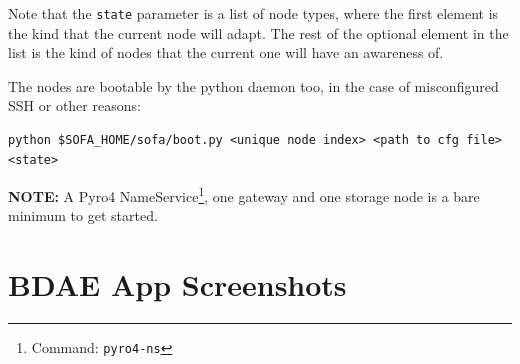 Note that the \texttt{state} parameter is a list of node types, where the first element is the kind that the current node will adapt. The rest of the optional element in the list is the kind of nodes that the current one will have an awareness of.
\newline

The nodes are bootable by the python daemon too, in the case of misconfigured SSH or other reasons:
\vspace*{2mm}

\begin{lstlisting}[numbers=none, backgroundcolor=\color{sourcebackground}, rulecolor=\color{sourcebackground}, framextopmargin=5pt, framexbottommargin=5pt, frame=tb, xrightmargin=15pt, commentstyle=\color{bashcommetcolor}, showstringspaces=false, deletendkeywords={file, list}]
	python $SOFA_HOME/sofa/boot.py <unique node index> <path to cfg file> <state>
\end{lstlisting}	

{\sffamily\textbf{NOTE:}} A Pyro4 NameService\footnote{Command: \texttt{pyro4-ns}}, one gateway and one storage node is a bare minimum to get started.

\chapter{BDAE App Screenshots}

